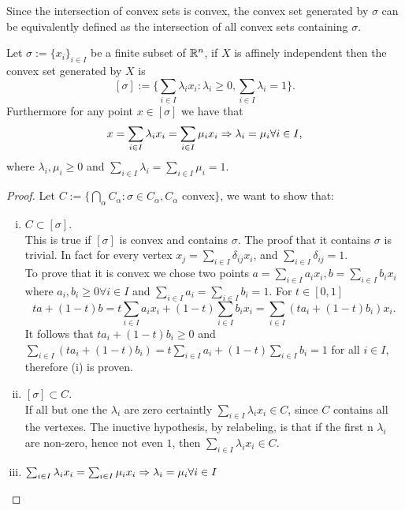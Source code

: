 \documentclass[../1.tex]{subfiles}
\begin{document}
    Since the intersection of convex sets is convex, the convex set generated by $\sigma$ can be equivalently defined as the intersection 
    of all convex sets containing $\sigma$.

    \begin{thm}
        Let $\sigma := \{x_i\}_{i \in I}$ be a finite subset of $\mathbb{R}^n$, if $X$ is affinely independent then the convex set generated by $X$ is 
        \[ [\sigma] := \{ \sum_{i \in I} \lambda_i x_i : \lambda_i \geq 0, \sum_{i \in I} \lambda_i = 1\}. \]
        Furthermore for any point $x \in [\sigma]$ we have that
        \[ x = \sum_{i \in I} \lambda_i x_i = \sum_{i \in I} \mu_i x_i \Rightarrow \lambda_i = \mu_i \forall i \in I, \] 
        where $\lambda_i,\mu_i \geq 0$ and $\sum_{i \in I} \lambda_i = \sum_{i \in I} \mu_i =1$.
        \label{thm:1}
    \end{thm}

    \begin{proof}
        Let $C := \{ \bigcap_\alpha C_\alpha : \sigma \in C_\alpha, C_\alpha$ convex$\}$, we want to show that:
        \begin{enumerate}[(i)]
            \item $C \subset [\sigma]$.\\
            This is true if $[\sigma]$ is convex and contains $\sigma$.
            The proof that it contains $\sigma$ is trivial. In fact for every vertex $x_j = \sum_{i \in I} \delta_{ij} x_i$,
            and $\sum_{i \in I}\delta_{ij} = 1$.\\
            To prove that it is convex we chose two points $a = \sum_{i \in I} a_i x_i, b = \sum_{i \in I} b_i x_i$ where $a_i,b_i \geq 0 \forall i \in I$
            and $\sum_{i \in I} a_i = \sum_{i \in I} b_i = 1$. For $t \in [0,1]$
            \[ ta+(1-t)b = t\sum_{i \in I} a_i x_i + (1-t) \sum_{i \in I} b_i x_i = \sum_{i \in I} (ta_i + (1-t)b_i)x_i.\]
            It follows that $ta_i + (1-t)b_i \geq 0$ and $\sum_{i \in I} (ta_i + (1-t)b_i) = t\sum_{i \in I}a_i + (1-t)\sum_{i \in I}b_i = 1$ for all $i \in I$,
            therefore (i) is proven.
            \item $[\sigma] \subset C$.\\
            If all but one the $\lambda_i$ are zero certaintly $\sum_{i \in I} \lambda_i x_i \in C$, since $C$ contains all the vertexes.
            The inuctive hypothesis, by relabeling, is that if the first n $\lambda_i$ are non-zero, hence not even $1$, then $\sum_{i \in I} \lambda_i x_i \in C$.
            \item $\sum_{i \in I} \lambda_i x_i = \sum_{i \in I} \mu_i x_i \Rightarrow \lambda_i = \mu_i \forall i \in I$
        \end{enumerate}
    \end{proof}
\end{document}
